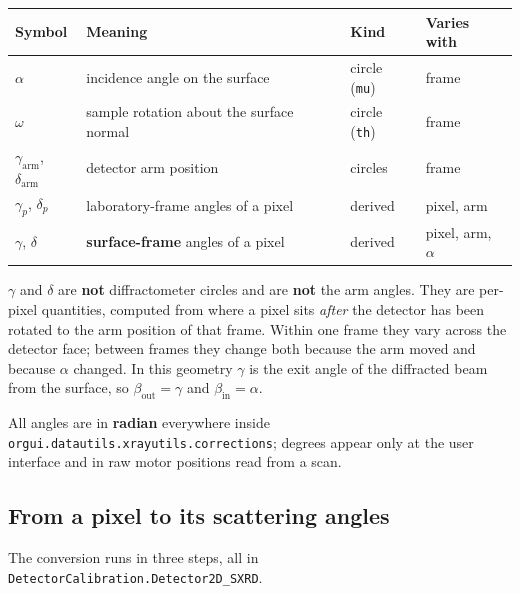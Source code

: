 \documentclass[11pt,a4paper]{article}
\newcommand{\bin}{\beta_{\mathrm{in}}}
\newcommand{\bout}{\beta_{\mathrm{out}}}
\newcommand{\code}[1]{\texttt{\small #1}}
\newcommand{\dt}{.\allowbreak}
\begin{document}
\begin{center}
\begin{tabular}{@{}llll@{}}
\toprule
Symbol & Meaning & Kind & Varies with \\
\midrule
$\alpha$ & incidence angle on the surface & circle (\code{mu})
  & frame \\
$\omega$ & sample rotation about the surface normal & circle (\code{th})
  & frame \\
$\gamma_{\mathrm{arm}}$, $\delta_{\mathrm{arm}}$
  & detector arm position & circles & frame \\
\addlinespace
$\gamma_p$, $\delta_p$ & laboratory-frame angles of a pixel & derived
  & pixel, arm \\
$\gamma$, $\delta$ & \textbf{surface-frame} angles of a pixel & derived
  & pixel, arm, $\alpha$ \\
\bottomrule
\end{tabular}
\end{center}

\noindent
$\gamma$ and $\delta$ are \textbf{not} diffractometer circles and are
\textbf{not} the arm angles. They are per-pixel quantities, computed from
where a pixel sits \emph{after} the detector has been rotated to the arm
position of that frame. Within one frame they vary across the detector face;
between frames they change both because the arm moved and because $\alpha$
changed. In this geometry $\gamma$ is the exit angle of the diffracted beam
from the surface, so $\bout = \gamma$ and $\bin = \alpha$.

All angles are in \textbf{radian} everywhere inside
\code{orgui\dt datautils\dt xrayutils\dt corrections}; degrees appear only at
the user interface and in raw motor positions read from a scan.

\subsection{From a pixel to its scattering angles}
\label{sec:pixelangles}

The conversion runs in three steps, all in
\code{DetectorCalibration\dt Detector2D\_SXRD}.
\end{document}
